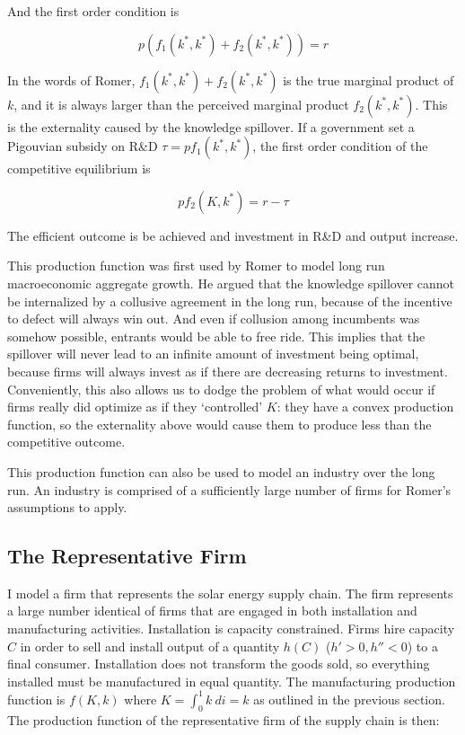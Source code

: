 \documentclass{article}
\begin{document}
And the first order condition is

\[
p \left( f_1(k^*,k^*) +  f_2(k^*,k^*)\right)= r
\]

In the words of Romer, $f_1(k^*,k^*) +  f_2(k^*,k^*)$ is the true marginal product of $k$, and it is always larger than the perceived marginal product $f_2(k^*, k^*)$. This is the externality caused by the knowledge spillover. If a government set a Pigouvian subsidy on R\&D $\tau = pf_1(k^*, k^*)$, the first order condition of the competitive equilibrium is

\[
p f_2(K,k^*) = r - \tau 
\]
 
The efficient outcome is be achieved and investment in R\&D and output increase.

This production function was first used by Romer to model long run macroeconomic aggregate growth. He argued that the knowledge spillover cannot be internalized by a collusive agreement in the long run, because of the incentive to defect will always win out. And even if collusion among incumbents was somehow possible, entrants would be able to free ride. This implies that the spillover will never lead to an infinite amount of investment being optimal, because firms will always invest as if there are decreasing returns to investment. Conveniently, this also allows us to dodge the problem of what would occur if firms really did optimize as if they `controlled' $K$: they have a convex production function, so the externality above would cause them to produce less than the competitive outcome. 

This production function can also be used to model an industry over the long run. An industry is comprised of a sufficiently large number of firms for Romer's assumptions to apply. 

\subsection{The Representative Firm}

I model a firm that represents the solar energy supply chain. The firm represents a large number identical of firms that are engaged in both installation and manufacturing activities. Installation is capacity constrained. Firms hire capacity $C$ in order to sell and install output of a quantity $h(C)$ ($h'>0, h''<0$)  to a final consumer. Installation does not transform the goods sold, so everything installed must be manufactured in equal quantity. The manufacturing production function is $f(K,k)$ where $K = \int_0^1 k ~ di = k$ as outlined in the previous section. The production function of the representative firm of the supply chain is then:
\end{document}
